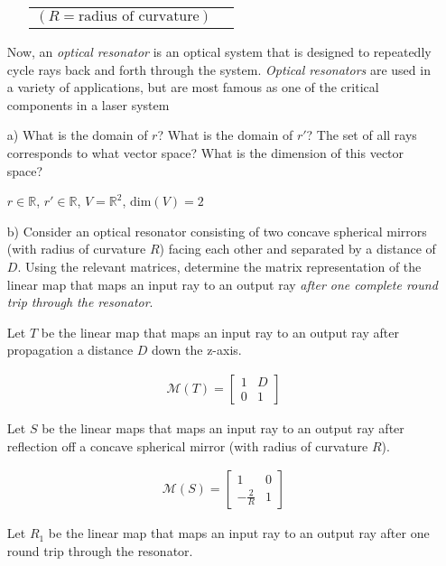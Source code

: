 \documentclass[fleqn]{article}
\begin{document}
\begin{enumerate}[nolistsep]
\begin{itemize}
					\begin{tabularx}{0.85\textwidth}{>{\hsize=0.75\hsize}X  >{\hsize=0.25\hsize}X}
						$(R = \text{radius of curvature})$ &\\						
					\end{tabularx}
			\end{itemize}
			\endgroup
				
			Now, an \textit{optical resonator} is an optical system that is designed to repeatedly cycle rays back and forth through the system. \textit{Optical resonators} are used in a variety of applications, but are most famous as one of the critical components in a laser system
			
			\item[a)] What is the domain of $r$? What is the domain of $r'$? The set of all rays corresponds to what vector space? What is the dimension of this vector space?
			
			$r \in \mathbb{R}$, $r' \in \mathbb{R}$, $V = \mathbb{R}^2$, $\text{dim}(V) = 2$
			
			\item[b)] Consider an optical resonator consisting of two concave spherical mirrors (with radius of curvature $R$) facing each other and separated by a distance of $D$. Using the relevant matrices, determine the matrix representation of the linear map that maps an input ray to an output ray \textit{after one complete round trip through the resonator}.
			
			Let $T$ be the linear map that maps an input ray to an output ray after propagation a distance $D$ down the z-axis.
			
			\begin{align*}
				\mathcal{M}(T) = \begin{bmatrix}1 & D\\ 0 & 1\end{bmatrix}
			\end{align*}
			
			Let $S$ be the linear maps that maps an input ray to an output ray after reflection off a concave spherical mirror (with radius of curvature $R$).
			
			\begin{align*}
				\mathcal{M}(S) = \begin{bmatrix} 1 & 0\\ -\frac{2}{R} & 1 \end{bmatrix}
			\end{align*}
			
			\pagebreak
			Let $R_1$ be the linear map that maps an input ray to an output ray after one round trip through the resonator.
			

\end{enumerate}
\end{document}
